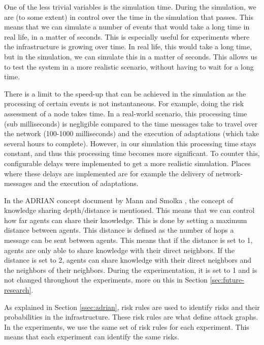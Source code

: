 
\label{sssec:simulation-time}
One of the less trivial variables is the simulation time. During the simulation, we are (to some extent) in control over the time in the simulation that passes. This means that we can simulate a number of events that would take a long time in real life, in a matter of seconds. This is especially useful for  experiments where the infrastructure is growing over time. In real life, this would take a long time, but in the simulation, we can simulate this in a matter of seconds. This allows us to test the system in a more realistic scenario, without having to wait for a long time.

There is a limit to the speed-up that can be achieved in the simulation as the processing of certain events is not instantaneous. For example, doing the risk assessment of a node takes time. In a real-world scenario, this processing time (sub milliseconds) is negligible compared to the time messages take to travel over the network (100-1000 milliseconds) and the execution of adaptations (which take several hours to complete). However, in our simulation this processing time stays constant, and thus this processing time becomes more significant. To counter this, configurable delays were implemented to get a more realistic simulation. 
Places where these delays are implemented are for example the delivery of network-messages and the execution of adaptations. 

\label{sssec:knowledge-depth}
In the ADRIAN concept document by Mann and Smolka \cite{mann2023ADRIAN}, the concept of knowledge sharing depth/distance is mentioned.  This means that we can control how far agents can share their knowledge. This is done by setting a maximum distance between agents. This distance is defined as the number of hops a message can be sent between agents. This means that if the distance is set to 1, agents are only able to share knowledge with their direct neighbors. If the distance is set to 2, agents can share knowledge with their direct neighbors and the neighbors of their neighbors. During the experimentation, it is set to 1 and is not changed throughout the experiments, more on this in Section \ref{sec:future-research}.

\label{sssec:risk-rules}
As explained in Section \ref{ssec:adrian}, risk rules are used to identify risks and their probabilities in the infrastructure. These risk rules are what define attack graphs. In the experiments, we use the same set of risk rules for each experiment. This means that each experiment can identify the same risks.

